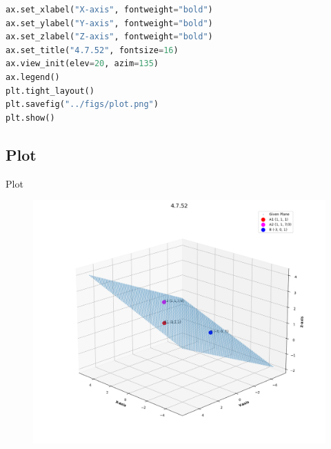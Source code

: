 \documentclass{beamer}
\theoremstyle{remark}
\numberwithin{equation}{section}
\begin{document}
\begin{frame}[fragile]
 \begin{lstlisting}[language=Python]
ax.set_xlabel("X-axis", fontweight="bold")
ax.set_ylabel("Y-axis", fontweight="bold")
ax.set_zlabel("Z-axis", fontweight="bold")
ax.set_title("4.7.52", fontsize=16)
ax.view_init(elev=20, azim=135)
ax.legend()
plt.tight_layout()
plt.savefig("../figs/plot.png")
plt.show()
 \end{lstlisting}
\end{frame}

\subsection{Plot}
\begin{frame}{Plot}
 \begin{figure}[H]
    \centering
    \includegraphics[width=0.8\columnwidth]{../figs/plot.png}
    \caption*{}
    \label{fig:plot}
\end{figure}
\end{frame}
\end{document}
